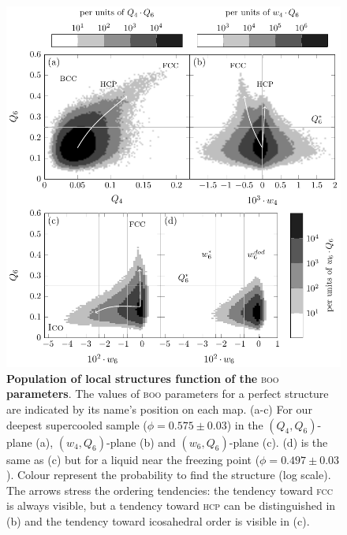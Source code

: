 \clearpage

\begin{figure}
\begin{center}
\includegraphics{generate_figures-figure1.pdf}
\end{center}
\caption{\textbf{Population of local structures function of the }\textsc{boo}\textbf{ parameters}. The values of \textsc{boo} parameters for a perfect structure are indicated by its name's position on each map. (a-c) For our deepest supercooled sample ($\phi=0.575\pm 0.03$) in the $(Q_4,Q_6)$-plane (a), $(w_4,Q_6)$-plane (b) and $(w_6,Q_6)$-plane (c). (d) is the same as (c) but for a liquid near the freezing point ($\phi = 0.497 \pm 0.03$). Colour represent the probability to find the structure (log scale). The arrows stress the ordering tendencies: the tendency toward \textsc{fcc} is always visible, but a tendency toward \textsc{hcp} can be distinguished in (b) and the tendency toward icosahedral order is visible in (c).}
	\label{fig:maps}
\end{figure}

\clearpage

